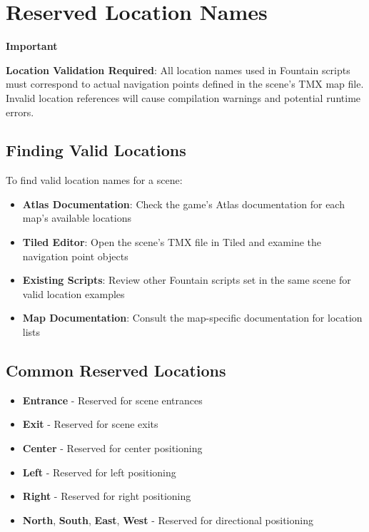 \documentclass[11pt,letterpaper,oldstylefigures]{memoir}
\newenvironment{Important}
{\begingroup
\small
\setlength{\parindent}{0pt}
\setlength{\parskip}{0.5em}
\allowdisplaybreaks
\setlength{\displaywidowpenalty}{0}
\setlength{\widowpenalty}{0}
\setlength{\clubpenalty}{0}
\setlength{\interlinepenalty}{0}
\begin{tcolorbox}[
    colback=yellow!5,
    colframe=yellow!75!black,
    boxrule=0.5pt,
    arc=2pt,
    left=0.5em,
    right=0.5em,
    top=0.25em,
    bottom=0.25em
]
\textbf{Important}
\end{tcolorbox}\par
}
{\endgroup}
\begin{document}
\section{Reserved Location Names}

\begin{Important}
\textbf{Location Validation Required}: All location names used in Fountain scripts must correspond to actual navigation points defined in the scene's TMX map file. Invalid location references will cause compilation warnings and potential runtime errors.
\end{Important}

\subsection{Finding Valid Locations}

To find valid location names for a scene:

\begin{itemize}
\item \textbf{Atlas Documentation}: Check the game's Atlas documentation for each map's available locations
\item \textbf{Tiled Editor}: Open the scene's TMX file in Tiled and examine the navigation point objects
\item \textbf{Existing Scripts}: Review other Fountain scripts set in the same scene for valid location examples
\item \textbf{Map Documentation}: Consult the map-specific documentation for location lists
\end{itemize}

\subsection{Common Reserved Locations}

\begin{itemize}
\item \textbf{Entrance} - Reserved for scene entrances
\item \textbf{Exit} - Reserved for scene exits
\item \textbf{Center} - Reserved for center positioning
\item \textbf{Left} - Reserved for left positioning
\item \textbf{Right} - Reserved for right positioning
\item \textbf{North}, \textbf{South}, \textbf{East}, \textbf{West} - Reserved for directional positioning
\end{itemize}
\end{document}
